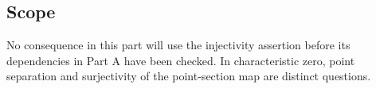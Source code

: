 \subsection{Scope}
No consequence in this part will use the injectivity assertion before
its dependencies in Part A have been checked. In characteristic zero,
point separation and surjectivity of the point-section map are distinct
questions.
